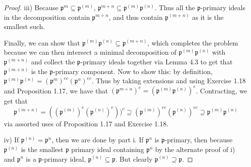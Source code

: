 \begin{proof}
	iii) 
	Because $\mathfrak{p}^{m} \subseteq \mathfrak{p}^{(m)}   $, $\mathfrak{p}^{m+n} \subseteq \mathfrak{p}^{(m)}\mathfrak{p}^{(n)}    $.
	Thus all the $\mathfrak{p} $-primary ideals in the decomposition contain $\mathfrak{p}^{m+n}  $, and thus contain $\mathfrak{p}^{(m+n)}  $ as it is the smallest such.

	Finally, we can show that $\mathfrak{p}^{(m)}\mathfrak{p}^{(n)}\subseteq \mathfrak{p}^{(m+n)}$, which completes the problem because we can then intersect a minimal decomposition of $\mathfrak{p}^{(m)}\mathfrak{p}^{(n)}   $ with $\mathfrak{p}^{(m+n)}  $ and collect the $\mathfrak{p}$-primary ideals together via Lemma 4.3 to get that $\mathfrak{p}^{(m+n)}  $ is the $\mathfrak{p} $-primary component.
	Now to show this: by definition, $\mathfrak{p}^{(m)}\mathfrak{p}^{(n)} = (\mathfrak{p}^m)^{ec}(\mathfrak{p}^n)^{ec}$.
	Thus by taking extensions and using Exercise 1.18 and Proposition 1.17, we have that $(\mathfrak{p}^{m+n})^e = (\mathfrak{p}^{(m)}\mathfrak{p}^{(n)})^e$.
	Contracting, we get that
	\[
		\mathfrak{p}^{(m+n)} = ((\mathfrak{p}^{(m)})^e (\mathfrak{p}^{(n)})^e))^c \supseteq (\mathfrak{p}^{(m)})^{ec} (\mathfrak{p}^{(n)})^{ec} \supseteq \mathfrak{p}^{(m)}\mathfrak{p}^{(n)}  
	\] 
	via assorted uses of Proposition 1.17 and Exercise 1.18.

	iv) If $\mathfrak{p}^{(n)} = \mathfrak{p}^n  $, then we are done by part i.
	If $\mathfrak{p}^n $ is $\mathfrak{p} $-primary, then because $\mathfrak{p}^{(n)}  $ is the smallest $\mathfrak{p} $ primary ideal containing $\mathfrak{p}^n $ by the alternate proof of i) and $\mathfrak{p}^n $ is a $\mathfrak{p} $-primary ideal, $\mathfrak{p}^{(n)} \subseteq \mathfrak{p}  $.
	But clearly $\mathfrak{p}^{(n)} \supseteq \mathfrak{p}  $.
\end{proof}

